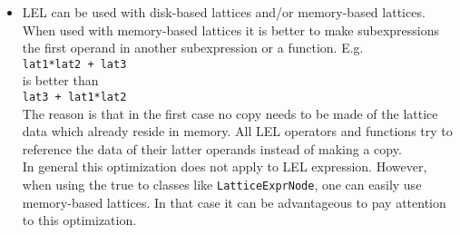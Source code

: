 \begin{itemize}
\item
LEL can be used with disk-based lattices and/or memory-based lattices.
When used with memory-based lattices it is better to make
subexpressions the first operand in another subexpression or a
function. E.g.
\\\texttt{lat1*lat2 + lat3}
\\is better than
\\\texttt{lat3 + lat1*lat2}
\\The reason is that in the first case no copy needs to be made of the
lattice data which already reside in memory. All LEL operators and
functions try to reference the data of their latter operands instead
of making a copy.
\\In general this optimization does not apply to LEL expression.
However, when using the true 
to classes like \texttt{LatticeExprNode}, one can easily use
memory-based lattices. In that case it can be advantageous to pay
attention to this optimization.

\end{itemize}


